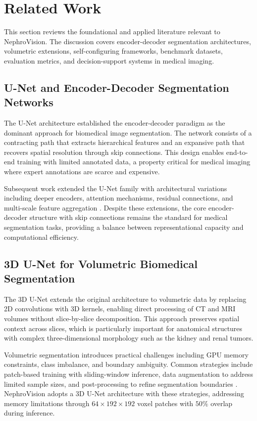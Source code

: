 \section{Related Work}

This section reviews the foundational and applied literature relevant to NephroVision. The discussion covers encoder-decoder segmentation architectures, volumetric extensions, self-configuring frameworks, benchmark datasets, evaluation metrics, and decision-support systems in medical imaging.

\subsection{U-Net and Encoder-Decoder Segmentation Networks}

The U-Net architecture \cite{unet} established the encoder-decoder paradigm as the dominant approach for biomedical image segmentation. The network consists of a contracting path that extracts hierarchical features and an expansive path that recovers spatial resolution through skip connections. This design enables end-to-end training with limited annotated data, a property critical for medical imaging where expert annotations are scarce and expensive.

Subsequent work extended the U-Net family with architectural variations including deeper encoders, attention mechanisms, residual connections, and multi-scale feature aggregation \cite{unet_variants}. Despite these extensions, the core encoder-decoder structure with skip connections remains the standard for medical segmentation tasks, providing a balance between representational capacity and computational efficiency.

\subsection{3D U-Net for Volumetric Biomedical Segmentation}

The 3D U-Net \cite{unet3d} extends the original architecture to volumetric data by replacing 2D convolutions with 3D kernels, enabling direct processing of CT and MRI volumes without slice-by-slice decomposition. This approach preserves spatial context across slices, which is particularly important for anatomical structures with complex three-dimensional morphology such as the kidney and renal tumors.

Volumetric segmentation introduces practical challenges including GPU memory constraints, class imbalance, and boundary ambiguity. Common strategies include patch-based training with sliding-window inference, data augmentation to address limited sample sizes, and post-processing to refine segmentation boundaries \cite{volumetric_segmentation_review}. NephroVision adopts a 3D U-Net architecture with these strategies, addressing memory limitations through $64 \times 192 \times 192$ voxel patches with $50\%$ overlap during inference.

